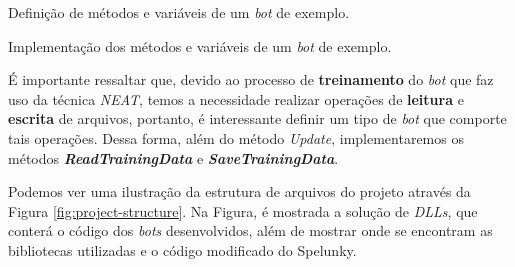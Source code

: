 \begin{algorithm}[H]

\caption[Definição de métodos e variáveis de um \textit{bot} de exemplo.]
{\label{alg:project-example-bot-header}Definição de métodos e variáveis de um
\textit{bot} de exemplo.}
\end{algorithm}

\begin{algorithm}[H]

\caption[Implementação dos métodos e variáveis de um \textit{bot} de exemplo.]
{\label{alg:project-example-bot-impl}Implementação dos métodos e variáveis de um
\textit{bot} de exemplo.}
\end{algorithm}

É importante ressaltar que, devido ao processo de \textbf{treinamento} do
\textit{bot} que faz uso da técnica \textit{NEAT}, temos a necessidade realizar
operações de \textbf{leitura} e \textbf{escrita} de arquivos, portanto, é
interessante definir um tipo de \textit{bot} que comporte tais operações. Dessa
forma, além do método \textit{Update}, implementaremos os métodos
\textbf{\textit{ReadTrainingData}} e \textbf{\textit{SaveTrainingData}}.

Podemos ver uma ilustração da estrutura de arquivos do projeto através da Figura
\ref{fig:project-structure}. Na Figura, é mostrada a solução de \textit{DLLs},
que conterá o código dos \textit{bots} desenvolvidos, além de mostrar onde se
encontram as bibliotecas utilizadas e o código modificado do Spelunky.

